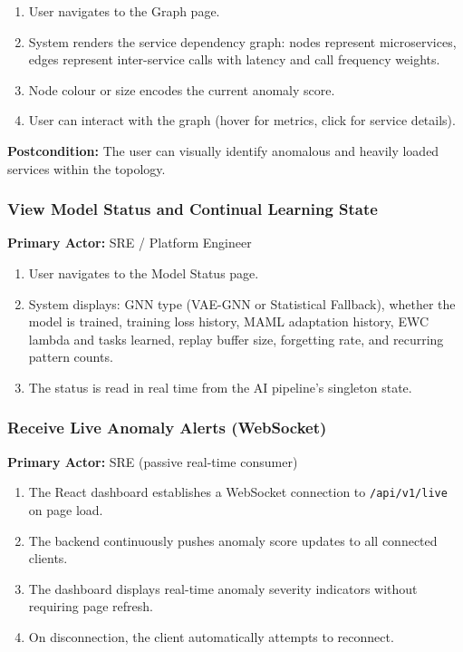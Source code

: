\documentclass[11pt,a4paper]{article}
\begin{document}
\begin{enumerate}
    \item User navigates to the Graph page.
    \item System renders the service dependency graph: nodes represent microservices, edges represent inter-service calls with latency and call frequency weights.
    \item Node colour or size encodes the current anomaly score.
    \item User can interact with the graph (hover for metrics, click for service details).
\end{enumerate}

\textbf{Postcondition:} The user can visually identify anomalous and heavily loaded services within the topology.

\subsubsection{View Model Status and Continual Learning State}

\textbf{Primary Actor:} SRE / Platform Engineer

\begin{enumerate}
    \item User navigates to the Model Status page.
    \item System displays: GNN type (VAE-GNN or Statistical Fallback), whether the model is trained, training loss history, MAML adaptation history, EWC lambda and tasks learned, replay buffer size, forgetting rate, and recurring pattern counts.
    \item The status is read in real time from the AI pipeline's singleton state.
\end{enumerate}

\subsubsection{Receive Live Anomaly Alerts (WebSocket)}

\textbf{Primary Actor:} SRE (passive real-time consumer)

\begin{enumerate}
    \item The React dashboard establishes a WebSocket connection to \texttt{/api/v1/live} on page load.
    \item The backend continuously pushes anomaly score updates to all connected clients.
    \item The dashboard displays real-time anomaly severity indicators without requiring page refresh.
    \item On disconnection, the client automatically attempts to reconnect.
\end{enumerate}
\end{document}
